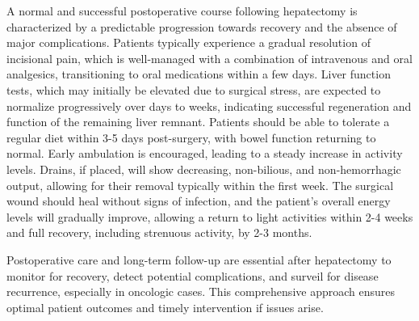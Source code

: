 A normal and successful postoperative course following hepatectomy is characterized by a predictable progression towards recovery and the absence of major complications. Patients typically experience a gradual resolution of incisional pain, which is well-managed with a combination of intravenous and oral analgesics, transitioning to oral medications within a few days. Liver function tests, which may initially be elevated due to surgical stress, are expected to normalize progressively over days to weeks, indicating successful regeneration and function of the remaining liver remnant. Patients should be able to tolerate a regular diet within 3-5 days post-surgery, with bowel function returning to normal. Early ambulation is encouraged, leading to a steady increase in activity levels. Drains, if placed, will show decreasing, non-bilious, and non-hemorrhagic output, allowing for their removal typically within the first week. The surgical wound should heal without signs of infection, and the patient's overall energy levels will gradually improve, allowing a return to light activities within 2-4 weeks and full recovery, including strenuous activity, by 2-3 months.

Postoperative care and long-term follow-up are essential after hepatectomy to monitor for recovery, detect potential complications, and surveil for disease recurrence, especially in oncologic cases. This comprehensive approach ensures optimal patient outcomes and timely intervention if issues arise.

